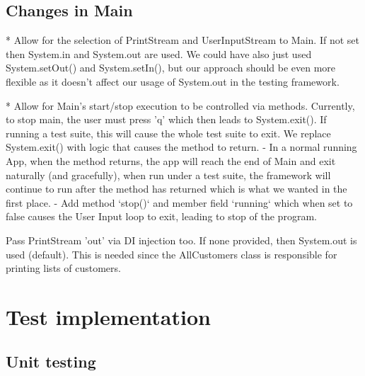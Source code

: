 \documentclass[11pt]{article}
\begin{document}
\subsection{Changes in Main}

* Allow for the selection of PrintStream and UserInputStream to Main. If not set then System.in and System.out are used. 
We could have also just used System.setOut() and System.setIn(), but our approach should be even more flexible as it doesn't affect our usage of System.out in the testing framework. 


* Allow for Main's start/stop execution to be controlled via methods. Currently, to stop main, the user must press 'q' which then leads to System.exit(). If running a test suite, this will cause the whole test suite to exit. We replace System.exit() with logic that causes the method to return. 
 -	In a normal running App,   when the method returns, the app will reach the end of Main and exit naturally (and gracefully), when run under a test suite, the framework will continue to run after the method has returned which is what we wanted in the first place. 
  - Add method `stop()` and member field `running` which when set to false causes the User Input loop to exit, leading to stop of the program.


Pass PrintStream 'out' via DI injection too. If none provided, then System.out is used (default). This is needed since the AllCustomers class is responsible for printing lists of customers.  


\section{Test implementation}


\subsection{Unit testing}
\end{document}
